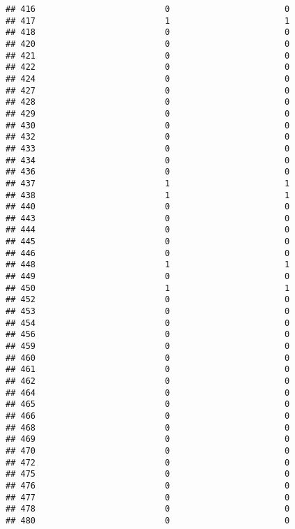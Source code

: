 \documentclass[
]{article}
\begin{document}
\begin{verbatim}
## 416                          0                       0
## 417                          1                       1
## 418                          0                       0
## 420                          0                       0
## 421                          0                       0
## 422                          0                       0
## 424                          0                       0
## 427                          0                       0
## 428                          0                       0
## 429                          0                       0
## 430                          0                       0
## 432                          0                       0
## 433                          0                       0
## 434                          0                       0
## 436                          0                       0
## 437                          1                       1
## 438                          1                       1
## 440                          0                       0
## 443                          0                       0
## 444                          0                       0
## 445                          0                       0
## 446                          0                       0
## 448                          1                       1
## 449                          0                       0
## 450                          1                       1
## 452                          0                       0
## 453                          0                       0
## 454                          0                       0
## 456                          0                       0
## 459                          0                       0
## 460                          0                       0
## 461                          0                       0
## 462                          0                       0
## 464                          0                       0
## 465                          0                       0
## 466                          0                       0
## 468                          0                       0
## 469                          0                       0
## 470                          0                       0
## 472                          0                       0
## 475                          0                       0
## 476                          0                       0
## 477                          0                       0
## 478                          0                       0
## 480                          0                       0

\end{verbatim}
\end{document}
